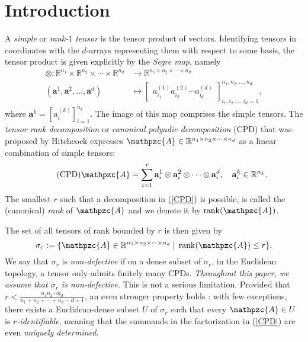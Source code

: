 \documentclass[a4paper,10pt,final]{siamart1116}
\newcommand{\tensor}[1]{\mathpzc{#1}}
\newcommand{\vect}[1]{\mathbf{#1}}
\newcommand{\sten}[3]{\vect{#1}_{#2}^{#3}}
\newcommand{\R}{\mathbb{R}}
\newcommand{\refeqn}[1]{{(\ref{#1})}}
\newcommand{\rank}{\operatorname{rank}}
\numberwithin{equation}{section}
\numberwithin{figure}{section}
\numberwithin{table}{section}
\numberwithin{theorem}{section}
\begin{document}
\section{Introduction}\label{sec_introduction}
A \emph{simple} or \emph{rank-$1$ tensor} is the tensor product of vectors. Identifying tensors in coordinates with the $d$-arrays representing them with respect to some basis, the tensor product is given explicitly by the \emph{Segre map}, namely
\begin{align}\label{segre_map}
 \otimes: \R^{n_1} \times \R^{n_2} \times \cdots \times \R^{n_d} &\to \R^{n_1 \times n_2 \times \cdots \times n_d}\\ (\sten{a}{}{1}, \sten{a}{}{2}, \ldots, \sten{a}{}{d})
 &\mapsto
 \begin{bmatrix} a_{i_1}^{(1)} a_{i_2}^{(2)} \cdots a_{i_d}^{(d)} \end{bmatrix}_{i_1,i_2,\ldots,i_d=1}^{n_1,n_2,\ldots,n_d},\nonumber
\end{align}
where $\sten{a}{}{k} = [a_{i}^{(k)}]_{i=1}^{n_k}$. The image of this map comprises the simple tensors.
The \emph{tensor rank decomposition} or \emph{canonical polyadic decomposition} (CPD) that was proposed by Hitchcock \cite{Hitchcock1927} expresses $\tensor{A} \in \R^{n_1 \times n_2 \times \cdots \times n_d}$ as a linear combination of simple tensors:
\begin{equation}\tag{CPD}\label{CPD}
 \tensor{A} = \sum_{i=1}^r \sten{a}{i}{1} \otimes \sten{a}{i}{2} \otimes \cdots \otimes \sten{a}{i}{d}, \quad \sten{a}{i}{k} \in \R^{n_k}.
\end{equation}
The smallest $r$ such that a decomposition in \refeqn{CPD} is possible, is called the (canonical) \emph{rank} of $\tensor{A}$ and we denote it by $\rank(\tensor{A})$.

The set of all tensors of rank bounded by $r$ is then given by
\[
 \sigma_r := \{ \tensor{A} \in \R^{n_1 \times n_2 \times \cdots \times n_d}  \;|\; \rank(\tensor{A}) \le r \}.
\]
We say that $\sigma_r$ is \emph{non-defective} if on a dense subset of $\sigma_r$, in the Euclidean topology, a tensor only admits finitely many CPDs. \emph{Throughout this paper, we assume that $\sigma_r$ is non-defective.} This is not a serious limitation. Provided that $r < \frac{n_1 n_2 \cdots n_d}{n_1 + n_2 + \cdots + n_d - d + 1}$, an even stronger property holds \cite{COV2014,COV2017}: with few exceptions, there exists a Euclidean-dense subset $U$ of $\sigma_r$ such that every $\tensor{A} \in U$ is \emph{$r$-identifiable}, meaning that the summands in the factorization in \refeqn{CPD} are even \emph{uniquely determined}.
\end{document}
